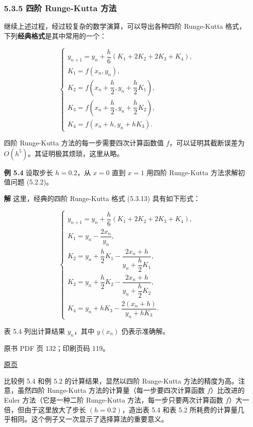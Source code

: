 \subsubsection{5.3.5 四阶 Runge-Kutta 方法}\label{ch05a-ux56dbux9636-runge-kutta-ux65b9ux6cd5}

继续上述过程，经过较复杂的数学演算，可以导出各种四阶 Runge-Kutta 格式，下列\textbf{经典格式}是其中常用的一个：

\[
\begin{cases}
y_{n+1}=y_n+\dfrac{h}{6}(K_1+2K_2+2K_3+K_4),\\
K_1=f(x_n,y_n),\\
K_2=f\left(x_n+\dfrac{h}{2},y_n+\dfrac{h}{2}K_1\right),\\
K_3=f\left(x_n+\dfrac{h}{2},y_n+\dfrac{h}{2}K_2\right),\\
K_4=f(x_n+h,y_n+hK_3).
\end{cases}\tag{5.3.13}
\]

四阶 Runge-Kutta 方法的每一步需要四次计算函数值 \(f\)，可以证明其截断误差为 \(O(h^5)\)。其证明极其烦琐，这里从略。

\textbf{例 5.4} 设取步长 \(h=0.2\)，从 \(x=0\) 直到 \(x=1\) 用四阶 Runge-Kutta 方法求解初值问题 (5.2.2)。

\textbf{解} 这里，经典的四阶 Runge-Kutta 格式 (5.3.13) 具有如下形式：

\[
\begin{cases}
y_{n+1}=y_n+\dfrac{h}{6}(K_1+2K_2+2K_3+K_4),\\
K_1=y_n-\dfrac{2x_n}{y_n},\\
K_2=y_n+\dfrac{h}{2}K_1-\dfrac{2x_n+h}{y_n+\dfrac{h}{2}K_1},\\
K_3=y_n+\dfrac{h}{2}K_2-\dfrac{2x_n+h}{y_n+\dfrac{h}{2}K_2},\\
K_4=y_n+hK_3-\dfrac{2(x_n+h)}{y_n+hK_3}.
\end{cases}
\]

表 5.4 列出计算结果 \(y_n\)，其中 \(y(x_n)\) 仍表示准确解。

\clearpage

原书 PDF 页 132；印刷页码 119。

\href{source-images/pdf-132.jpeg}{原页}

比较例 5.4 和例 5.2 的计算结果，显然以四阶 Runge-Kutta 方法的精度为高。注意，虽然四阶 Runge-Kutta 方法的计算量（每一步要四次计算函数 \(f\)）比改进的 Euler 方法（它是一种二阶 Runge-Kutta 方法，每一步只要两次计算函数 \(f\)）大一倍，但由于这里放大了步长 \((h=0.2)\)，造出表 5.4 和表 5.2 所耗费的计算量几乎相同。这个例子又一次显示了选择算法的重要意义。

